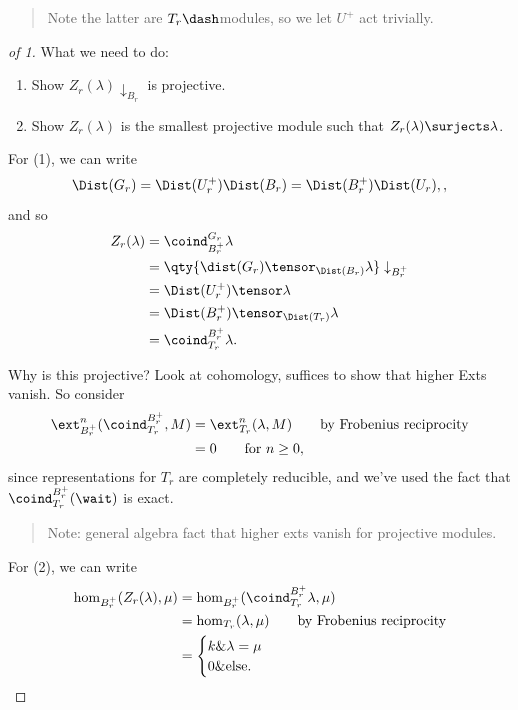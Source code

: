 \begin{quote}
Note the latter are \(T_r\dash\)modules, so we let \(U^+\) act
trivially.
\end{quote}

\begin{proof}[of 1]

What we need to do:

\begin{enumerate}
\def\labelenumi{\arabic{enumi}.}
\tightlist
\item
  Show \(Z_r(\lambda)\downarrow_{B_r}\) is projective.
\item
  Show \(Z_r(\lambda)\) is the smallest projective module such that
  \(Z_r(\lambda) \surjects \lambda\).
\end{enumerate}

For (1), we can write
\begin{align*}
\Dist(G_r) = \Dist(U_r^+) \Dist(B_r) = \Dist(B_r^+) \Dist(U_r),
,\end{align*} and so
\begin{align*}  
Z_r(\lambda) 
&= \coind_{B_r^+}^{G_r} \lambda \\
&= \qty{\dist(G_r) \tensor_{\Dist(B_r)} \lambda} \downarrow_{B_r^+} \\
&= \Dist(U_r^+)\tensor \lambda \\
&= \Dist(B_r^+) \tensor_{\Dist(T_r)} \lambda \\
&= \coind_{T_r}^{B_r^+} \lambda
.\end{align*}

Why is this projective? Look at cohomology, suffices to show that higher
Exts vanish. So consider
\begin{align*}  
\ext_{B_r^+}^n(\coind_{T_r}^{B_r^+}, M) 
&= \ext_{T_r}^n (\lambda, M) \qquad\text{by Frobenius reciprocity} \\
&= 0 \qquad \text{for } n \geq 0
,\end{align*} since representations for \(T_r\) are completely
reducible, and we've used the fact that \(\coind_{T_r}^{B_r^+}(\wait)\)
is exact.

\begin{quote}
Note: general algebra fact that higher exts vanish for projective
modules.
\end{quote}

For (2), we can write
\begin{align*}  
\hom_{B_r^+}(Z_r(\lambda), \mu)
&= \hom_{B_r^+}(\coind_{T_r}^{B_r^+} \lambda, \mu) \\
&= \hom_{T_r} (\lambda, \mu) \qquad\text{by Frobenius reciprocity} \\
&=
\begin{cases}
k \& \lambda = \mu \\
0 \& \text{else}.
\end{cases}
\end{align*}


\end{proof}

